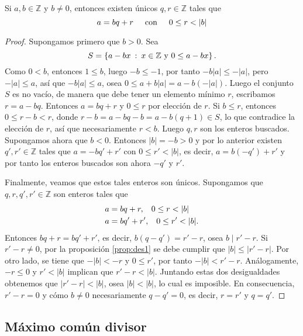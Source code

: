 \begin{theorem}
Si $a,b\in \mathbb{Z}$ y $b \neq 0$, entonces existen únicos $q,r\in \mathbb{Z}$ tales que 
\begin{equation*}
	a=bq+r\hspace*{0.5cm}\textnormal{con}\hspace*{0.5cm} 0\leq r<|b|
\end{equation*}
\end{theorem}
\begin{proof}
Supongamos primero que $b>0$. Sea 
\begin{equation*}
	S=\left\{a-bx \: : \: x\in \mathbb{Z}\textnormal{ y }0\leq a-bx\right\}.
\end{equation*}
Como $0<b$, entonces $1\leq b$, luego $-b\leq -1$, por tanto $-b|a|\leq -|a|$, pero $-|a|\leq a$, así que $-b|a|\leq a$, osea $0\leq a+b|a|=a-b(-|a|)$. Luego el conjunto $S$ es no vacío, de manera que debe tener un elemento mínimo $r$, escribamos $r=a-bq$. Entonces $a=bq+r$ y $0\leq r$ por elección de $r$. Si $b\leq r$, entonces $0\leq r-b<r$, donde $r-b=a-bq-b=a-b(q+1)\in S$, lo que contradice la elección de $r$, así que necesariamente $r<b$. Luego $q,r$ son los enteros buscados. Supongamos ahora que $b<0$. Entonces $|b|=-b>0$ y por lo anterior existen $q',r'\in \mathbb{Z}$ tales que $a=-bq'+r'$ con $0\leq r'<|b|$, es decir, $a=b(-q')+r'$ y por tanto los enteros buscados son ahora $-q'$ y $r'$. 
\bigskip

Finalmente, veamos que estos tales enteros son únicos. Supongamos que $q,r,q',r'\in\mathbb{Z}$ son enteros tales que 
\begin{align*}
	a &=bq+r,\hspace*{0.3cm}0\leq r<|b| \\
	a &=bq'+r',\hspace*{0.3cm}0\leq r'<|b|.
\end{align*}
Entonces $bq+r=bq'+r'$, es decir, $b(q-q')=r'-r$, osea $b \mid r'-r$. Si $r'-r \neq 0$, por la proposición \eqref{prop:des1} se debe cumplir que $|b|\leq |r'-r|$. Por otro lado, se tiene que $-|b|<-r$ y $0\leq r'$, por tanto $-|b|<r'-r$. Análogamente, $-r\leq 0$ y $r'<|b|$ implican que $r'-r<|b|$. Juntando estas dos desigualdades obtenemos que $|r'-r|<|b|$, osea $|b|<|b|$, lo cual es imposible. En consecuencia, $r'-r=0$ y cómo $b \neq 0$ necesariamente $q-q'=0$, es decir, $r=r'$ y $q=q'$.
\end{proof}

\subsection{Máximo común divisor}


